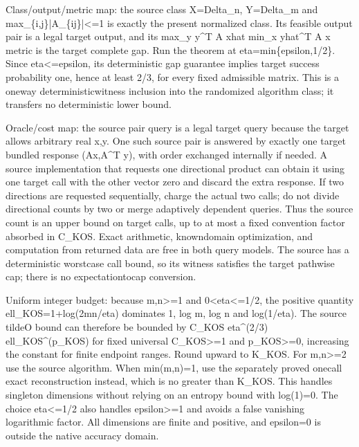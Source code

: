\documentclass[10pt,a4paper]{article}
\begin{document}
Class/output/metric map: the source class X=Delta\_n, Y=Delta\_m and max\_\{i,j\}|A\_\{ij\}|<=1 is exactly the present normalized class. Its feasible output pair is a legal target output, and its max\_y y\textasciicircum{}T A xhat  min\_x yhat\textasciicircum{}T A x metric is the target complete gap. Run the theorem at eta=min\{epsilon,1/2\}. Since eta<=epsilon, its deterministic gap guarantee implies target success probability one, hence at least 2/3, for every fixed admissible matrix. This is a oneway deterministicwitness inclusion into the randomized algorithm class; it transfers no deterministic lower bound.

Oracle/cost map: the source pair query is a legal target query because the target allows arbitrary real x,y. One such source pair is answered by exactly one target bundled response (Ax,A\textasciicircum{}T y), with order exchanged internally if needed. A source implementation that requests one directional product can obtain it using one target call with the other vector zero and discard the extra response. If two directions are requested sequentially, charge the actual two calls; do not divide directional counts by two or merge adaptively dependent queries. Thus the source count is an upper bound on target calls, up to at most a fixed convention factor absorbed in C\_KOS. Exact arithmetic, knowndomain optimization, and computation from returned data are free in both query models. The source has a deterministic worstcase call bound, so its witness satisfies the target pathwise cap; there is no expectationtocap conversion.

Uniform integer budget: because m,n>=1 and 0<eta<=1/2, the positive quantity ell\_KOS=1+log(2mn/eta) dominates 1, log m, log n and log(1/eta). The source tildeO bound can therefore be bounded by C\_KOS eta\textasciicircum{}(2/3) ell\_KOS\textasciicircum{}(p\_KOS) for fixed universal C\_KOS>=1 and p\_KOS>=0, increasing the constant for finite endpoint ranges. Round upward to K\_KOS. For m,n>=2 use the source algorithm. When min(m,n)=1, use the separately proved onecall exact reconstruction instead, which is no greater than K\_KOS. This handles singleton dimensions without relying on an entropy bound with log(1)=0. The choice eta<=1/2 also handles epsilon>=1 and avoids a false vanishing logarithmic factor. All dimensions are finite and positive, and epsilon=0 is outside the native accuracy domain.
\end{document}
